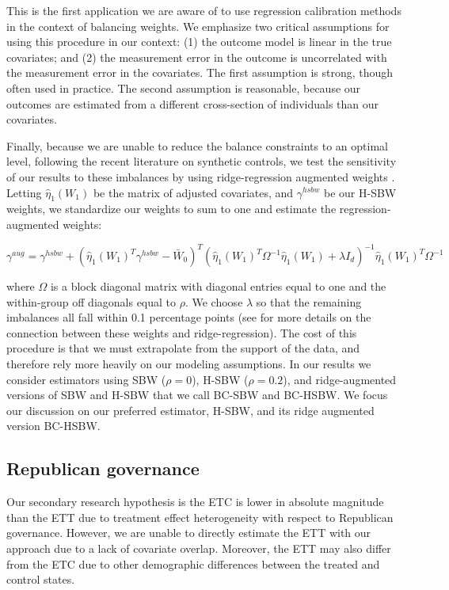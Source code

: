 \documentclass[aoas]{imsart}
\theoremstyle{plain}
\theoremstyle{remark}
\begin{document}
This is the first application we are aware of to use regression calibration methods in the context of balancing weights. We emphasize two critical assumptions for using this procedure in our context: (1) the outcome model is linear in the true covariates; and (2) the measurement error in the outcome is uncorrelated with the measurement error in the covariates. The first assumption is strong, though often used in practice. The second assumption is reasonable, because our outcomes are estimated from a different cross-section of individuals than our covariates. 

Finally, because we are unable to reduce the balance constraints to an optimal level, following the recent literature on synthetic controls, we test the sensitivity of our results to these imbalances by using ridge-regression augmented weights \cite{ben2018augmented}. Letting $\hat{\eta}_1(W_1)$ be the matrix of adjusted covariates, and $\gamma^{hsbw}$ be our H-SBW weights, we standardize our weights to sum to one and estimate the regression-augmented weights:

\begin{equation}
\gamma^{aug} = \gamma^{hsbw} + (\hat{\eta}_1(W_1)^T\gamma^{hsbw} - \bar{W}_0)^T(\hat{\eta}_1(W_1)^T\Omega^{-1}\hat{\eta}_1(W_1) + \lambda I_d)^{-1}\hat{\eta}_1(W_1)^T\Omega^{-1}
\end{equation}

where $\Omega$ is a block diagonal matrix with diagonal entries equal to one and the within-group off diagonals equal to $\rho$. We choose $\lambda$ so that the remaining imbalances all fall within 0.1 percentage points (see \cite{ben2018augmented} for more details on the connection between these weights and ridge-regression). The cost of this procedure is that we must extrapolate from the support of the data, and therefore rely more heavily on our modeling assumptions. In our results we consider estimators using SBW ($\rho = 0$), H-SBW ($\rho = 0.2$), and ridge-augmented versions of SBW and H-SBW that we call BC-SBW and BC-HSBW. We focus our discussion on our preferred estimator, H-SBW, and its ridge augmented version BC-HSBW. 

\subsection{Republican governance}

Our secondary research hypothesis is the ETC is lower in absolute magnitude than the ETT due to treatment effect heterogeneity with respect to Republican governance. However, we are unable to directly estimate the ETT with our approach due to a lack of covariate overlap. Moreover, the ETT may also differ from the ETC due to other demographic differences between the treated and control states. 
\end{document}
